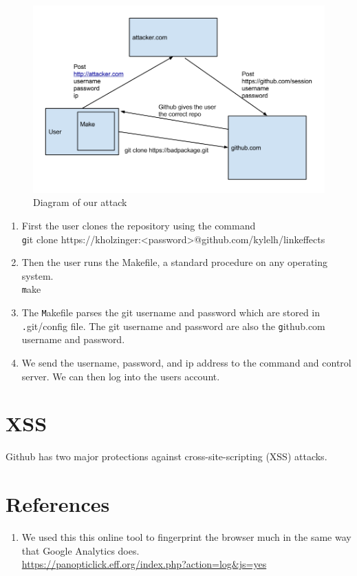 \documentclass[12pt]{article}
\renewcommand{\tt}[1]{\texttt{#1}}
\begin{document}
\begin{figure}
\centering
\includegraphics[scale=.5]{attack.png}
\caption{Diagram of our attack\newline}
\label{fig:mig_over}
\end{figure}

\begin{enumerate}
\item First the user clones the repository using the command\\ {\tt git clone https://kholzinger:<password>@github.com/kylelh/linkeffects}
\item Then the user runs the Makefile, a standard procedure on any operating system.\\
{\tt make}

\item The {\tt Makefile} parses the git username and password which are stored in {\tt .git/config} file. The git username and password are also the {\tt github.com} username and password.
\item We send the username, password, and ip address to the command and control server. We can then log into the users account.


\end{enumerate}

\section{XSS}

Github has two major protections against cross-site-scripting (XSS) attacks. 




\section{References}\label{references}
\begin{enumerate}
\item We used this this online tool to fingerprint the browser much in the same way that Google Analytics does.\\ \url{https://panopticlick.eff.org/index.php?action=log&js=yes}
\end{enumerate}
\end{document}
